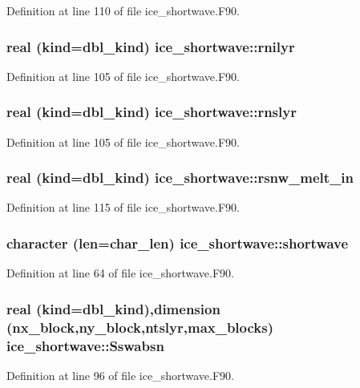 Definition at line 110 of file ice\_\-shortwave.F90.\hypertarget{namespaceice__shortwave_aadfde47ad01a2e1dae6a025ccd26c203}{
\subsubsection[{rnilyr}]{\setlength{\rightskip}{0pt plus 5cm}real (kind=dbl\_\-kind) {\bf ice\_\-shortwave::rnilyr}}}
\label{namespaceice__shortwave_aadfde47ad01a2e1dae6a025ccd26c203}


Definition at line 105 of file ice\_\-shortwave.F90.\hypertarget{namespaceice__shortwave_ad12f4239092092b69b1b300e947a1164}{
\subsubsection[{rnslyr}]{\setlength{\rightskip}{0pt plus 5cm}real (kind=dbl\_\-kind) {\bf ice\_\-shortwave::rnslyr}}}
\label{namespaceice__shortwave_ad12f4239092092b69b1b300e947a1164}


Definition at line 105 of file ice\_\-shortwave.F90.\hypertarget{namespaceice__shortwave_ab259ebc59a0a09d26c7242306435b662}{
\subsubsection[{rsnw\_\-melt\_\-in}]{\setlength{\rightskip}{0pt plus 5cm}real (kind=dbl\_\-kind) {\bf ice\_\-shortwave::rsnw\_\-melt\_\-in}}}
\label{namespaceice__shortwave_ab259ebc59a0a09d26c7242306435b662}


Definition at line 115 of file ice\_\-shortwave.F90.\hypertarget{namespaceice__shortwave_ab269b293b710b271291a8d83e5994a7e}{
\subsubsection[{shortwave}]{\setlength{\rightskip}{0pt plus 5cm}character (len=char\_\-len) {\bf ice\_\-shortwave::shortwave}}}
\label{namespaceice__shortwave_ab269b293b710b271291a8d83e5994a7e}


Definition at line 64 of file ice\_\-shortwave.F90.\hypertarget{namespaceice__shortwave_a174658715b844908a4691581fd3b83c9}{
\subsubsection[{Sswabsn}]{\setlength{\rightskip}{0pt plus 5cm}real (kind=dbl\_\-kind),dimension (nx\_\-block,ny\_\-block,ntslyr,max\_\-blocks) {\bf ice\_\-shortwave::Sswabsn}}}
\label{namespaceice__shortwave_a174658715b844908a4691581fd3b83c9}


Definition at line 96 of file ice\_\-shortwave.F90.